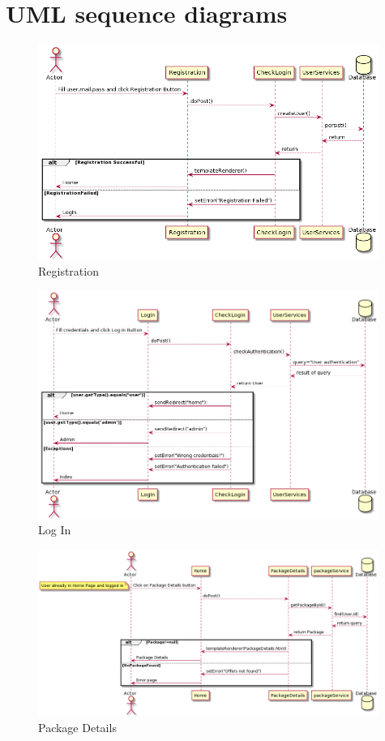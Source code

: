 \documentclass{article}
\begin{document}
\newpage
\section{UML sequence diagrams}

\begin{figure}[hbt!]
\centering
\includegraphics[width=0.99\textwidth]{Registration.png}
\caption{Registration}
\end{figure}

\begin{figure}[hbt!]
\centering
\includegraphics[width=0.99\textwidth]{LogIn.png}
\caption{Log In}
\end{figure}

\begin{figure}[hbt!]
\centering
\includegraphics[width=0.99\textwidth]{PackDetails.png}
\caption{Package Details}
\end{figure}
\end{document}

